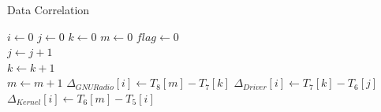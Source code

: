 \begin{algorithm}[!h]
\caption{Data Correlation}
\begin{algorithmic}
\State $i \gets 0$
\State $j \gets 0$
\State $k \gets 0$
\State $m \gets 0$
\State $flag \gets 0$
\hspace{1.35cm}\\
\hspace{1.70cm}$j \gets j+1$
\EndWhile
\hspace{1.35cm}\\
\hspace{1.7cm}$k \gets k+1$
\EndWhile
\hspace{1.35cm}\\
\hspace{1.7cm}$m \gets m+1$
\EndWhile
\hspace{1.35cm}\State $\Delta_{GNU Radio}[i] \gets T_8[m]-T_7[k]$
\hspace{1.35cm}\State $\Delta_{Driver}[i] \gets T_7[k]-T_6[j]$
\hspace{1.35cm}\State $\Delta_{Kernel}[i] \gets T_6[m]-T_5[i]$
\EndFor
\end{algorithmic}
\label{data}
\end{algorithm}

